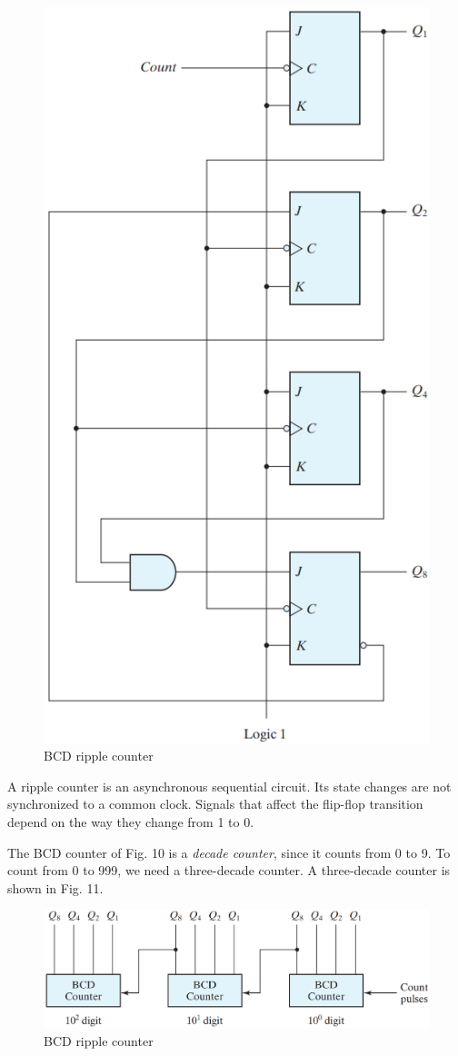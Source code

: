 \begin{figure}[H]
  \centering
  \includegraphics[width=.9\linewidth]{img/fig-6.10.png}
  \caption{BCD ripple counter}
  \label{fig:6.10}
\end{figure}

A ripple counter is an asynchronous sequential circuit. Its state changes are not synchronized to a common clock. Signals that affect the flip-flop transition depend on the way they change from 1 to 0.

The BCD counter of Fig. 10 is a \textit{decade counter}, since it counts from 0 to 9. To count from 0 to 999, we need a three-decade counter. A three-decade counter is shown in Fig. 11. 

\begin{figure}[H]
  \centering
  \includegraphics[width=\linewidth]{img/fig-6.11.png}
  \caption{BCD ripple counter}
  \label{fig:6.11}
\end{figure}
